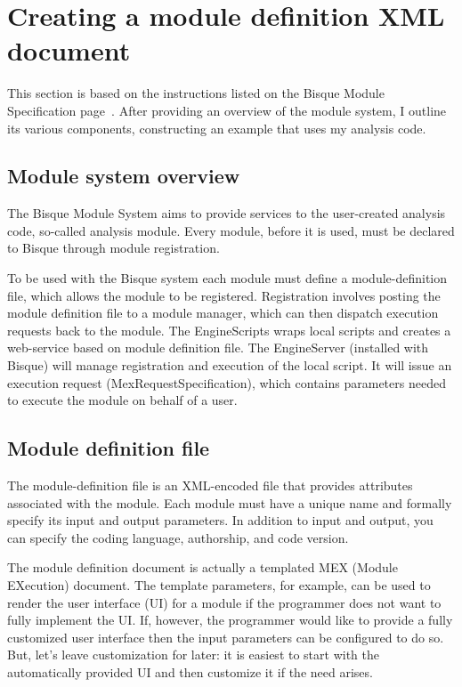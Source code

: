 \section{Creating a module definition XML document}
\label{sec:creating-module-definition-XML}

This section is based on the instructions listed on the Bisque Module Specification page~\cite{Bisque-module-specification}.
After providing an overview of the module system, I outline its various components, constructing an example that uses my analysis code. 

\subsection{Module system overview}

The Bisque Module System aims to provide services to the user-created analysis code, so-called analysis module. Every module, before it is used, must be declared to Bisque through module registration. 

To be used with the Bisque system each module must define a module-definition file, which allows the module to be registered. 
Registration involves posting the module definition file to a module manager, %
which can then dispatch execution requests back to the module. The  EngineScripts wraps local scripts and creates a web-service based on module definition file. The EngineServer (installed with Bisque) will manage registration and execution of the local script. It will issue an execution request (MexRequestSpecification), which contains parameters needed to execute the module on behalf of a user. 


\subsection{ Module definition file}

The module-definition file is an XML-encoded file that provides attributes associated with the module. Each module must have a unique name and formally specify its input and output parameters. In addition to input and output, you can specify the coding language, authorship, and code version. 

The module definition document is actually a templated MEX (Module EXecution) document. The template parameters, for example, can be used to render the user interface (UI) for a module if the programmer does not want to fully implement the UI. If, however, the programmer would like to provide a fully customized user interface then the input parameters can be configured to do so. But, let's leave customization for later: it is easiest to start with the automatically provided UI and then customize it if the need arises. 

